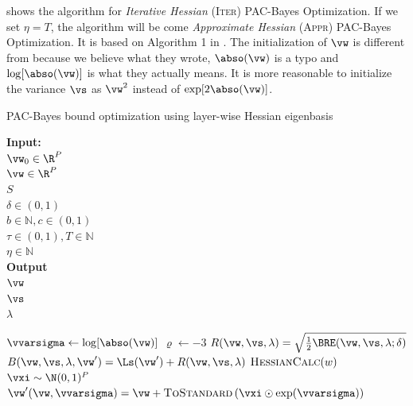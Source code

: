  shows the algorithm for \emph{Iterative Hessian} (\textsc{Iter}) PAC-Bayes Optimization. If we set $\eta = T$, the algorithm will be come \emph{Approximate Hessian} (\textsc{Appr}) PAC-Bayes Optimization. It is based on Algorithm 1 in \citet{dziugaite2017computing}. The initialization of $\vw$ is different from \citet{dziugaite2017computing} because we believe what they wrote, $\abso(\vw)$ is a typo and $\log[\abso(\vw)]$ is what they actually means. It is more reasonable to initialize the variance $\vs$ as $\vw^2$ instead of $\exp[2\abso(\vw)]$.

\begin{algorithm}[ht]
\caption{PAC-Bayes bound optimization using layer-wise Hessian eigenbasis}
\textbf{Input:}\\
\algind$\vw_0\in\R^P$\\
\algind$\vw\in \R^P$\\
\algind$S$ \\
\algind$\delta \in (0,1)$ \\
\algind$b \in \mathbb{N}, c \in (0,1)$ \\
\algind$\tau\in(0,1), T \in\mathbb{N}$ \\
\algind$\eta \in \mathbb{N}$ \\
\textbf{Output}\\
\algind$\vw$\\
\algind$\vs$\\
\algind$\lambda$
\begin{algorithmic}[1]
    \State $\vvarsigma \gets \log[\abso(\vw)]$
    \State $\varrho \gets -3$
    \State $R(\vw, \vs, \lambda) = \sqrt{\frac{1}{2}\BRE(\vw,\vs,\lambda; \delta)}$
    \State $B(\vw,\vs,\lambda,\vw') = \Ls(\vw')+R(\vw,\vs,\lambda)$
            \State $\textsc{HessianCalc}(w)$
        \EndIf
        \State {} $\vxi \sim \N(0,1)^P$ 
        \State $\vw'(\vw,\vvarsigma)= \vw +\textsc{ToStandard}\left(\vxi \odot \exp(\vvarsigma)\right)$ 

\end{algorithmic}
\end{algorithm}
